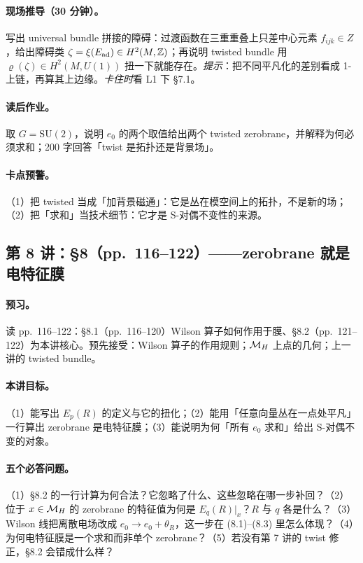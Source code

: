{\paragraph{现场推导（30 分钟）。}写出 universal bundle 拼接的障碍：过渡函数在三重重叠上只差中心元素 \(f_{ijk}\in Z\)，给出障碍类 \(\zeta=\xi(E_{\mathrm{ad}})\in H^{2}(M,\mathbb{Z})\)；再说明 twisted bundle 用 \(\varrho(\zeta)\in H^{2}(M,U(1))\) 扭一下就能存在。\emph{提示}：把不同平凡化的差别看成 1-上链，再算其上边缘。\emph{卡住时}看 L1 下 §7.1。\pC

\paragraph{读后作业。}取 \(G=\mathrm{SU}(2)\)，说明 \(e_0\) 的两个取值给出两个 twisted zerobrane，并解释为何必须求和；200 字回答「twist 是拓扑还是背景场」。\pC

\paragraph{卡点预警。}（1）把 twisted 当成「加背景磁通」：它是丛在模空间上的拓扑，不是新的场；（2）把「求和」当技术细节：它才是 S-对偶不变性的来源。\pC

\subsection{第 8 讲：\S8（pp.~116--122）——zerobrane 就是电特征膜}

\paragraph{预习。}读 pp.~116--122：§8.1（pp.~116--120）Wilson 算子如何作用于膜、§8.2（pp.~121--122）为本讲核心。预先接受：Wilson 算子的作用规则；\(\mathcal{M}_H\) 上点的几何；上一讲的 twisted bundle。\pC

\paragraph{本讲目标。}（1）能写出 \(E_p(R)\) 的定义与它的扭化；（2）能用「任意向量丛在一点处平凡」一行算出 zerobrane 是电特征膜；（3）能说明为何「所有 \(e_0\) 求和」给出 S-对偶不变的对象。\pC

\paragraph{五个必答问题。}（1）§8.2 的一行计算为何合法？它忽略了什么、这些忽略在哪一步补回？（2）位于 \(x\in\mathcal{M}_H\) 的 zerobrane 的特征值为何是 \(E_q(R)|_x\)？\(R\) 与 \(q\) 各是什么？（3）Wilson 线把离散电场改成 \(e_0\to e_0+\theta_R\)，这一步在 (8.1)--(8.3) 里怎么体现？（4）为何电特征膜是一个求和而非单个 zerobrane？（5）若没有第 7 讲的 twist 修正，§8.2 会错成什么样？\pC

}
